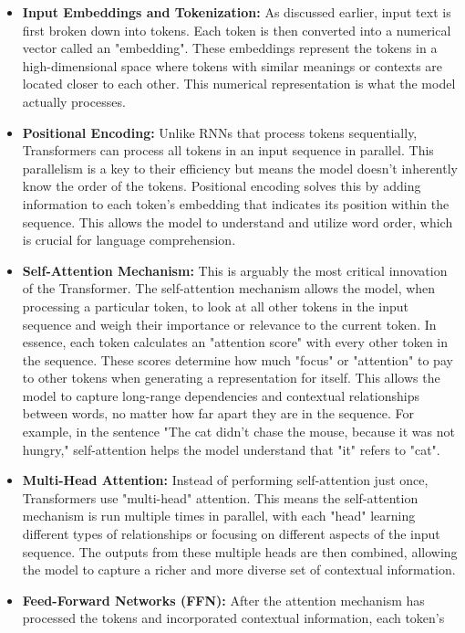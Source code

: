 \begin{itemize}
    \item \textbf{Input Embeddings and Tokenization:} As discussed earlier, input text is first broken down into tokens. Each token is then converted 
    into a numerical vector called an "embedding". These embeddings represent the tokens in a high-dimensional space where tokens with similar meanings 
    or contexts are located closer to each other. This numerical representation is what the model actually processes.
    \item \textbf{Positional Encoding:} Unlike RNNs that process tokens sequentially, Transformers can process all tokens in an input sequence in 
    parallel. This parallelism is a key to their efficiency but means the model doesn't inherently know the order of the tokens. Positional encoding 
    solves this by adding information to each token's embedding that indicates its position within the sequence. This allows the model to understand 
    and utilize word order, which is crucial for language comprehension.
    \item \textbf{Self-Attention Mechanism:} This is arguably the most critical innovation of the Transformer. The self-attention mechanism allows the 
    model, when processing a particular token, to look at all other tokens in the input sequence and weigh their importance or relevance to the current token.
    In essence, each token calculates an "attention score" with every other token in the sequence. These scores determine how much "focus" or "attention" to pay
     to other tokens when generating a representation for itself. This allows the model to capture long-range dependencies and contextual relationships between words, 
     no matter how far apart they are in the sequence. For example, in the sentence "The cat didn't chase the mouse, because it was not hungry," self-attention 
     helps the model understand that "it" refers to "cat".
    \item \textbf{Multi-Head Attention:} Instead of performing self-attention just once, Transformers use "multi-head" attention. This means the self-attention 
    mechanism is run multiple times in parallel, with each "head" learning different types of relationships or focusing on different aspects of the input sequence. 
    The outputs from these multiple heads are then combined, allowing the model to capture a richer and more diverse set of contextual information.
    \item \textbf{Feed-Forward Networks (FFN):} After the attention mechanism has processed the tokens and incorporated contextual information, each token's 

\end{itemize}
